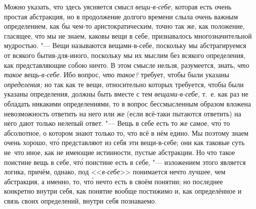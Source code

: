 Можно указать, что здесь уясняется смысл
{\em вещи-в-себе,} которая есть очень простая
абстракция, но в продолжение долгого времени слыла очень важным
определением, как бы чем-то аристократическим, точно так же, как положение,
гласящее, что мы не знаем, каковы вещи в себе, признавалось
многозначительной мудростью. "--- Вещи называются вещами-в-себе, поскольку мы
абстрагируемся от всякого бытия-для-иного, поскольку мы их мыслим без
всякого определения, как представляющие собою ничто. В этом смысле нельзя,
разумеется, знать, {\em что такое}
вещь-{\em в-себе}. Ибо вопрос,
{\em что такое?} требует, чтобы были указаны
{\em определения;} но так как те вещи, относительно
которых требуется, чтобы были указаны определения, должны быть вместе с тем
{\em вещами-в-себе,} т.~е. как раз не обладать никакими
определениями, то в вопрос бессмысленным образом вложена невозможность
ответить на него или же (если всё-таки пытаются ответить) на него дают только
нелепый ответ. "--- Вещь в себе есть то же самое, чт\'{о} то абсолютное,
о котором знают только то, что всё в нём едино. Мы поэтому знаем очень
хорошо, чт\'{о} представляют из себя эти вещи-в-себе; они как таковые суть
не~что иное, как не имеющие истинности, пустые абстракции. Но что такое
поистине вещь в себе, чт\'{о} поистине есть в себе, "--- изложением этого
является логика, причём, однако, под <<{\em в-себе}>> понимается нечто
лучшее, чем абстракция, а именно, то, чт\'{о} нечто есть в своём понятии;
но последнее конкретно внутри себя, как понятие вообще постижимо и, как
определённое и связь своих определений, внутри себя познаваемо.

